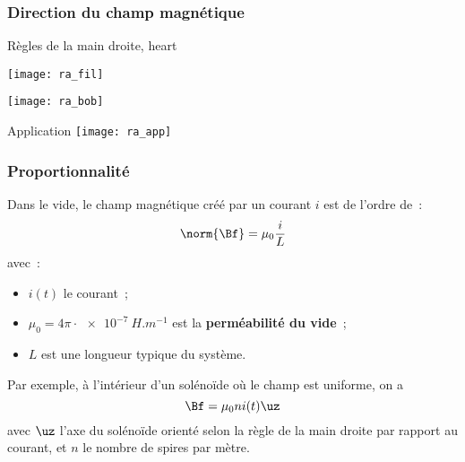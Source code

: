 \documentclass[../main/main.tex]{subfiles}
\begin{document}
\subsubsection{Direction du champ magnétique}
\label{sssec:chpdir}
\begin{tprop}{Règles de la main droite, heart}
	\begin{minipage}[t]{.45\linewidth}
		\begin{center}
			\texttt{[image: ra\_fil]}
			\label{fig:rafil}
		\end{center}
	\end{minipage}
	\hfill
	\begin{minipage}[t]{.45\linewidth}
		\begin{center}
			\texttt{[image: ra\_bob]}
			\label{fig:rabob}
		\end{center}
	\end{minipage}
\end{tprop}
\begin{rexem}{Application}
	\centering
	\texttt{[image: ra\_app]}
\end{rexem}

\subsubsection{Proportionnalité}
\label{sssec:prop}
Dans le vide, le champ magnétique créé par un courant $i$ est de l'ordre de~:
\[
	\norm{\Bf} = \mu_0 \frac{i}{L}
\]
avec~:
\begin{itemize}[label=$\diamond$, leftmargin=10pt]
	\item $i (t)$ le courant~;
	\item $\mu_0 = 4\pi\cdot \SI{e-7}{H.m ^{-1}}$ est la \textbf{perméabilité du
		      vide}~;
	\item $L$ est une longueur typique du système.
\end{itemize}
Par exemple, à l'intérieur d'un solénoïde où le champ est uniforme, on a
\[
	\Bf = \mu_0ni (t)\uz
\]
avec $\uz$ l'axe du solénoïde orienté selon la règle de la main droite par
rapport au courant, et $n$ le nombre de spires par mètre.
\end{document}
